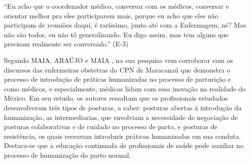 \begin{citacao}
``Eu acho que o coordenador médico, conversar com os médicos, conversar e orientar melhor pra eles participarem mais, porque eu acho que eles não participam de reuniões daqui, é raríssimo, junto até com a Enfermagem, né? Mas não são todos, eu não tô generalizando. Eu digo assim, mas tem alguns que precisam realmente ser conversado.'' (E-3) 
\end{citacao}

Segundo MAIA, ARAÚJO e MAIA \citeyear{da2018violencia}, na sua pesquisa vem corroborar com os discursos das enfermeiras obstetras do CPN de Maracanaú que demonstra o processo de introdução de práticas humanizadas no processo de parturição e como médicos, e especialmente, médicas lidam com essa inovação na realidade do México. Em seu estudo, os autores ressaltam que os profissionais estudados desenvolveram três tipos de posturas, a saber: posturas abertas à introdução da humanização, as intermediarias, que envolviam a necessidade de negociação de posturas colaborativas e de cuidado no processo de parto, e posturas de resistência, os quais receavam introduzir práticas humanizadas em sua conduta. Destaca-se que a educação continuada de profissionais de saúde pode auxiliar no processo de humanização do parto normal.